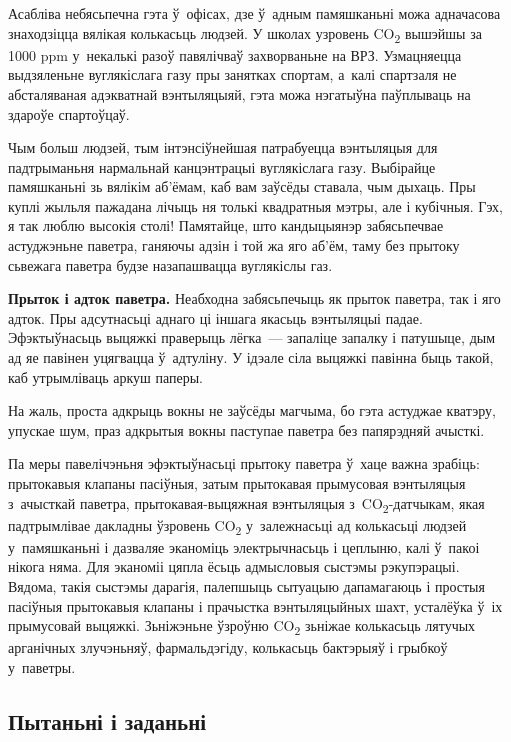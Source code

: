 Асабліва небясьпечна гэта ў~офісах, дзе ў~адным памяшканьні можа адначасова знаходзіцца вялікая колькасьць людзей. У школах узровень CO\textsubscript{2} вышэйшы за 1000 ppm у~некалькі разоў павялічваў захворваньне на ВРЗ. Узмацняецца выдзяленьне вуглякіслага газу пры занятках спортам, а~калі спартзаля не абсталяваная адэкватнай вэнтыляцыяй, гэта можа нэгатыўна паўплываць на здароўе спартоўцаў.

Чым больш людзей, тым інтэнсіўнейшая патрабуецца вэнтыляцыя для падтрыманьня нармальнай канцэнтрацыі вуглякіслага газу. Выбірайце памяшканьні зь вялікім аб'ёмам, каб вам заўсёды ставала, чым дыхаць. Пры куплі жыльля пажадана лічыць ня толькі квадратныя мэтры, але і кубічныя. Гэх, я так люблю высокія столі! Памятайце, што кандыцыянэр забясьпечвае астуджэньне паветра, ганяючы адзін і той жа яго аб'ём, таму без прытоку сьвежага паветра будзе назапашвацца вуглякіслы газ.

\textbf{Прыток і адток паветра.} Неабходна забясьпечыць як прыток паветра, так і яго адток. Пры адсутнасьці аднаго ці іншага якасьць вэнтыляцыі падае. Эфэктыўнасьць выцяжкі праверыць лёгка~--- запаліце запалку і патушыце, дым ад яе павінен уцягвацца ў~адтуліну. У ідэале сіла выцяжкі павінна быць такой, каб утрымліваць аркуш паперы.


На жаль, проста адкрыць вокны не заўсёды магчыма, бо гэта астуджае кватэру, упускае шум, праз адкрытыя вокны паступае паветра без папярэдняй ачысткі.

Па меры павелічэньня эфэктыўнасьці прытоку паветра ў~хаце важна зрабіць: прытокавыя клапаны пасіўныя, затым прытокавая прымусовая вэнтыляцыя з~ачысткай паветра, прытокавая-выцяжная вэнтыляцыя з~CO\textsubscript{2}-датчыкам, якая падтрымлівае дакладны ўзровень CO\textsubscript{2} у~залежнасьці ад колькасьці людзей у~памяшканьні і дазваляе эканоміць электрычнасьць і цеплыню, калі ў~пакоі нікога няма. Для эканоміі цяпла ёсьць адмысловыя сыстэмы рэкупэрацыі. Вядома, такія сыстэмы дарагія, палепшыць сытуацыю дапамагаюць і простыя пасіўныя прытокавыя клапаны і прачыстка вэнтыляцыйных шахт, усталёўка ў~іх прымусовай выцяжкі. Зьніжэньне ўзроўню CO\textsubscript{2} зьніжае колькасьць лятучых арганічных злучэньняў, фармальдэгіду, колькасьць бактэрыяў і грыбкоў у~паветры.

\subsection*{Пытаньні і заданьні}

